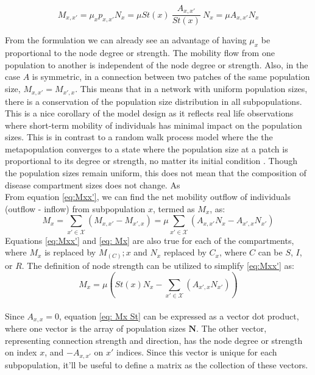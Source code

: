 \begin{equation}
    M_{x,x'} = \mu_x p_{x,x'} N_{x} = \mu  St(x) \ \frac{A_{x,x'}}{St(x)} \ N_{x} = \mu  A_{x,x'} N_{x}
    \label{eq:Mxx'}
\end{equation}

From the formulation we can already see an advantage of having $\mu_x$ be proportional to the node degree or strength. The mobility flow from one population to another is independent of the node degree or strength. Also, in the case $A$ is symmetric, in a connection between two patches of the same population size, $M_{x,x'}=M_{x',x}$. This means that in a network with uniform population sizes, there is a conservation of the population size distribution in all subpopulations. This is a nice corollary of the model design as it reflects real life observations where short-term mobility of individuals has minimal impact on the population sizes. This is in contrast to a random walk process model where the the metapopulation converges to a state where the population size at a patch is proportional to its degree or strength, no matter its initial condition \cite{colizza2008epidemic}. Though the population sizes remain uniform, this does not mean that the composition of disease compartment sizes does not change. As
\\
From equation \ref{eq:Mxx'}, we can find the net mobility outflow of individuals (outflow - inflow) from subpopulation $x$, termed as $M_x$, as:
\begin{equation}
    M_x = \sum_{x' \in \mathcal{X}} (M_{x,x'} - M_{x',x}) = \mu \sum_{x' \in \mathcal{X}} (A_{x,x'} N_{x} -  A_{x',x} N_{x'}) 
    \label{eq: Mx}
\end{equation}
Equations \ref{eq:Mxx'} and \ref{eq: Mx} are also true for each of the compartments, where $M_x$ is replaced by $M_(C);x$ and $N_x$ replaced by $C_x$, where $C$ can be $S$, $I$, or $R$. The definition of node strength can be utilized to simplify \ref{eq:Mxx'} as:
\begin{equation}
    M_x = \mu \left( St(x) N_x - \sum_{x' \in \mathcal{X}} (A_{x',x} N_{x'}) \right)
    \label{eq: Mx St}
\end{equation}
\\
Since $A_{x,x}=0$, equation \ref{eq: Mx St} can be expressed as a vector dot product, where one vector is the array of population sizes $\mathbf{N}$. The other vector, representing connection strength and direction, has the node degree or strength on index $x$, and $-A_{x,x'}$ on $x'$ indices. Since this vector is unique for each subpopulation, it'll be useful to define a matrix as the collection of these vectors. 

